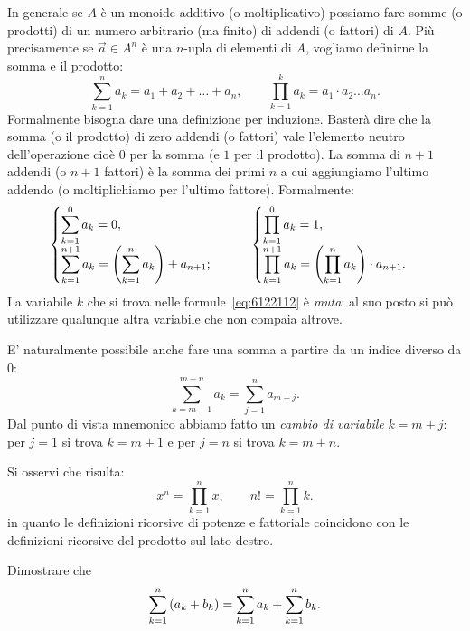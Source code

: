 In generale se $A$ è un monoide additivo 
(o moltiplicativo) possiamo fare somme (o prodotti) di un numero 
arbitrario (ma finito) di addendi (o fattori) di $A$.
Più precisamente se $\vec a \in A^n$ 
è una $n$-upla di elementi di $A$, 
vogliamo definirne la somma e il prodotto:
\begin{equation}\label{eq:6122112}
\sum_{k=1}^n a_k = a_1 + a_2 + \dots + a_n,
\qquad 
\prod_{k=1}^k a_k = a_1 \cdot a_2 \dots a_n.
\end{equation}
Formalmente bisogna dare una definizione per induzione. 
Basterà dire che la somma (o il prodotto)
di zero addendi (o fattori) vale l'elemento neutro 
dell'operazione cioè $0$ per la somma (e $1$ per il prodotto).
La somma di $n+1$ addendi (o $n+1$ fattori) è la somma dei primi $n$ 
a cui aggiungiamo l'ultimo addendo (o moltiplichiamo per l'ultimo fattore).
Formalmente:
\[
  \begin{cases}
    \displaystyle\sum_{k=1}^{0} a_k = 0, \\
    \displaystyle\sum_{k=1}^{n+1} a_k = {\left( \sum_{k=1}^{n} a_k \right)} + a_{n+1};
  \end{cases}  \qquad
  \begin{cases}
    \displaystyle\prod_{k=1}^{0} a_k = 1, \\
    \displaystyle\prod_{k=1}^{n+1} a_k = {\left( \prod_{k=1}^{n} a_k \right)} \cdot a_{n+1}.
  \end{cases}
\]
La variabile $k$ che si trova nelle formule~\eqref{eq:6122112} è \emph{muta}: 
al suo posto si può utilizzare qualunque altra variabile che non
compaia altrove.

E' naturalmente possibile anche fare una somma a partire da un indice 
diverso da $0$:
\[
  \sum_{k=m+1}^{m+n} a_k = \sum_{j=1}^{n} a_{m+j}.
\]
Dal punto di vista mnemonico abbiamo fatto 
un \emph{cambio di variabile} $k=m+j$:
per $j=1$ si trova $k=m+1$ e per $j=n$ si trova $k=m+n$.

Si osservi che risulta:
\[
  x^n = \prod_{k=1}^n x, \qquad 
  n! = \prod_{k=1}^n k.  
\]
in quanto le definizioni ricorsive di potenze e fattoriale
coincidono con le definizioni ricorsive del prodotto sul lato destro.


\begin{exercise}
Dimostrare che 
  \[
  \sum_{k=1}^n  {\left( a_k + b_k \right)} 
  = \sum_{k=1}^n a_k + \sum_{k=1}^n b_k.
  \]
\end{exercise}

